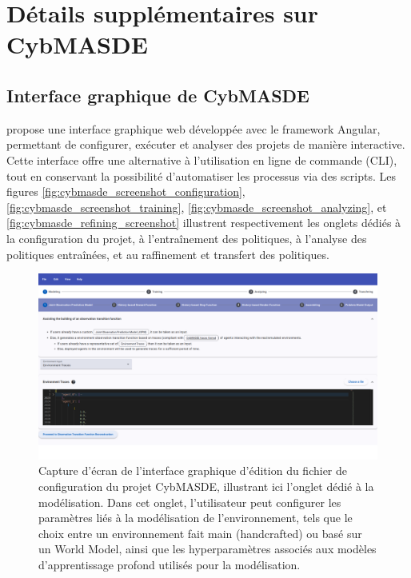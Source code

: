 \chapter{Détails supplémentaires sur CybMASDE}

\section{Interface graphique de CybMASDE}\label{appendix:cybmasde-gui}

 propose une interface graphique web développée avec le framework Angular, permettant de configurer, exécuter et analyser des projets de manière interactive. Cette interface offre une alternative à l'utilisation en ligne de commande (CLI), tout en conservant la possibilité d'automatiser les processus via des scripts. Les figures \autoref{fig:cybmasde_screenshot_configuration}, \autoref{fig:cybmasde_screenshot_training}, \autoref{fig:cybmasde_screenshot_analyzing}, et \autoref{fig:cybmasde_refining_screenshot} illustrent respectivement les onglets dédiés à la configuration du projet, à l'entraînement des politiques, à l'analyse des politiques entraînées, et au raffinement et transfert des politiques.

\begin{figure}[h!]
       \centering
       \includegraphics[width=\linewidth]{figures/CybMASDE_2.png}
       \caption{Capture d'écran de l'interface graphique d'édition du fichier de configuration du projet CybMASDE, illustrant ici l'onglet dédié à la modélisation. Dans cet onglet, l'utilisateur peut configurer les paramètres liés à la modélisation de l'environnement, tels que le choix entre un environnement fait main (handcrafted) ou basé sur un World Model, ainsi que les hyperparamètres associés aux modèles d'apprentissage profond utilisés pour la modélisation.}
       \label{fig:cybmasde_screenshot_configuration}
\end{figure}

